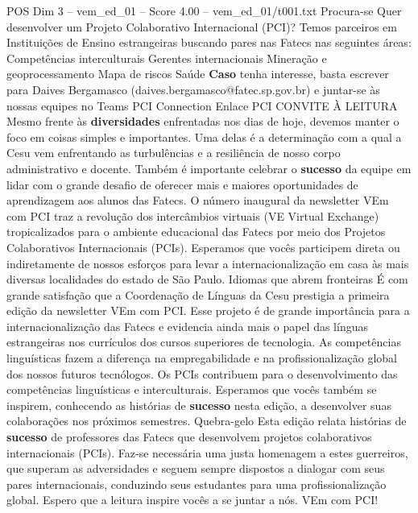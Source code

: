 \begin{textsample}{POS Dim 3 – vem\_ed\_01 – Score 4.00 – vem\_ed\_01/t001.txt}  \label{ex:f3_pos_118}
Procura-se Quer desenvolver um Projeto Colaborativo Internacional (PCI)?
Temos parceiros em Instituições de Ensino estrangeiras buscando pares nas Fatecs nas seguintes áreas: Competências interculturais Gerentes internacionais Mineração e geoprocessamento Mapa de riscos Saúde \textbf{Caso} tenha interesse, basta escrever para Daives Bergamasco (daives.bergamasco@fatec.sp.gov.br) e juntar-se às nossas equipes no Teams PCI Connection Enlace PCI CONVITE À LEITURA Mesmo frente às \textbf{diversidades} enfrentadas nos dias de hoje, devemos manter o foco em coisas simples e importantes.
Uma delas é a determinação com a qual a Cesu vem enfrentando as turbulências e a resiliência de nosso corpo administrativo e docente.
Também é importante celebrar o \textbf{sucesso} da equipe em lidar com o grande desafio de oferecer mais e maiores oportunidades de aprendizagem aos alunos das Fatecs.
O número inaugural da newsletter VEm com PCI traz a revolução dos intercâmbios virtuais (VE Virtual Exchange) tropicalizados para o ambiente educacional das Fatecs por meio dos Projetos Colaborativos Internacionais (PCIs).
Esperamos que vocês participem direta ou indiretamente de nossos esforços para levar a internacionalização em casa às mais diversas localidades do estado de São Paulo.
Idiomas que abrem fronteiras É com grande satisfação que a Coordenação de Línguas da Cesu prestigia a primeira edição da newsletter VEm com PCI.
Esse projeto é de grande importância para a internacionalização das Fatecs e evidencia ainda mais o papel das línguas estrangeiras nos currículos dos cursos superiores de tecnologia.
As competências linguísticas fazem a diferença na empregabilidade e na profissionalização global dos nossos futuros tecnólogos.
Os PCIs contribuem para o desenvolvimento das competências linguísticas e interculturais.
Esperamos que vocês também se inspirem, conhecendo as histórias de \textbf{sucesso} nesta edição, a desenvolver suas colaborações nos próximos semestres.
Quebra-gelo Esta edição relata histórias de \textbf{sucesso} de professores das Fatecs que desenvolvem projetos colaborativos internacionais (PCIs).
Faz-se necessária uma justa homenagem a estes guerreiros, que superam as adversidades e seguem sempre dispostos a dialogar com seus pares internacionais, conduzindo seus estudantes para uma profissionalização global.
Espero que a leitura inspire vocês a se juntar a nós.
VEm com PCI!

\end{textsample}
